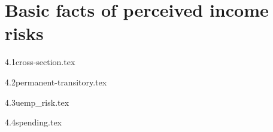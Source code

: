 \hypertarget{perceived-income-risks-basic-facts}{%
\section{Basic
facts of perceived income risks}\label{perceived-income-risks-basic-facts}}


{4.1cross-section.tex}


{4.2permanent-transitory.tex}



{4.3uemp_risk.tex}

{4.4spending.tex}


